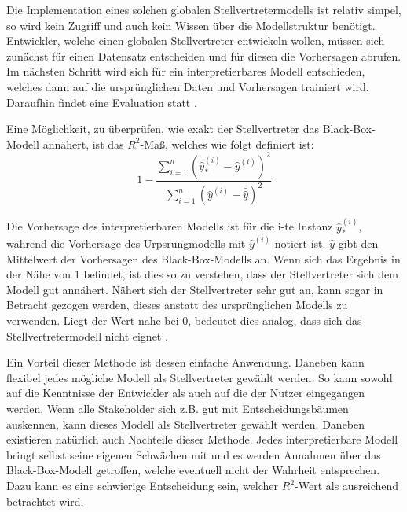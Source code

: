 Die Implementation eines solchen globalen Stellvertretermodells ist relativ simpel, so wird kein Zugriff und auch kein Wissen über die Modellstruktur benötigt. Entwickler, welche einen globalen Stellvertreter entwickeln wollen, müssen sich zunächst für einen Datensatz entscheiden und für diesen die Vorhersagen abrufen. Im nächsten Schritt wird sich für ein interpretierbares Modell entschieden, welches dann auf die ursprünglichen Daten und Vorhersagen trainiert wird. Daraufhin findet eine Evaluation statt \cite{molnar2022}.

Eine Möglichkeit, zu überprüfen, wie exakt der Stellvertreter das Black-Box-Modell annähert, ist das $R^{2}$-Maß, welches wie folgt definiert ist:
\begin{equation}
    1-\frac{\sum_{i=1}^n(\hat{y}_{*}^{(i)}-\hat{y}^{(i)})^{2}}{\sum_{i=1}^n(\hat{y}^{(i)}-\bar{\hat{y}})^{2}}
\end{equation}

Die Vorhersage des interpretierbaren Modells ist für die i-te Instanz $\hat{y}_{*}^{(i)}$, während die Vorhersage des Urpsrungmodells mit $\hat{y}^{(i)}$ notiert ist. $\bar{\hat{y}}$ gibt den Mittelwert der Vorhersagen des Black-Box-Modells an. Wenn sich das Ergebnis in der Nähe von 1 befindet, ist dies so zu verstehen, dass der Stellvertreter sich dem Modell gut annähert. Nähert sich der Stellvertreter sehr gut an, kann sogar in Betracht gezogen werden, dieses anstatt des ursprünglichen Modells zu verwenden. Liegt der Wert nahe bei 0, bedeutet dies analog, dass sich das Stellvertretermodell nicht eignet \cite{molnar2022}. %

Ein Vorteil dieser Methode ist dessen einfache Anwendung. Daneben kann flexibel jedes mögliche Modell als Stellvertreter gewählt werden. So kann sowohl auf die Kenntnisse der Entwickler als auch auf die der Nutzer eingegangen werden. Wenn alle Stakeholder sich z.B. gut mit Entscheidungsbäumen auskennen, kann dieses Modell als Stellvertreter gewählt werden. Daneben existieren natürlich auch Nachteile dieser Methode. Jedes interpretierbare Modell bringt selbst seine eigenen Schwächen mit und es werden Annahmen über das Black-Box-Modell getroffen, welche eventuell nicht der Wahrheit entsprechen. Dazu kann es eine schwierige Entscheidung sein, welcher $R^{2}$-Wert als ausreichend betrachtet wird.

